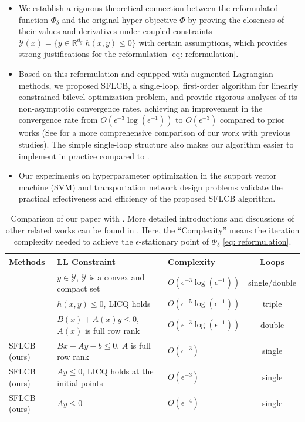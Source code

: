 \documentclass{article}
\newcommand{\Yc}{\mathcal{Y}}
\def\R{\mathbb{R}}
\theoremstyle{plain}
\theoremstyle{definition}
\theoremstyle{remark}
\begin{document}
\begin{itemize}[noitemsep,topsep=0pt,leftmargin = *]
    \item We establish a rigorous theoretical connection between the reformulated function $\Phi_\delta$ and the original hyper-objective $\Phi$ by proving the closeness of their values and derivatives under coupled constraints $\Yc(x)=\{y\in \R^{d_y} | h(x,y)\leq 0\}$ with certain assumptions, which provides strong justifications for the reformulation \eqref{eq: reformulation}.
    \item Based on this reformulation and equipped with augmented Lagrangian methods, 
    we proposed SFLCB, a single-loop, first-order algorithm for linearly constrained bilevel optimization problem,
    and provide rigorous analyses of its non-asymptotic convergence rates, achieving an improvement in the convergence rate from $O(\epsilon^{-3}\log(\epsilon^{-1}))$ to $O(\epsilon^{-3})$ compared to prior works (See  for a more comprehensive comparison of our work with previous studies). The simple single-loop structure also makes our algorithm easier to implement in practice compared to \cite{jiang2024primal}.
    \item Our experiments on hyperparameter optimization in the support vector machine (SVM) and transportation network design problems validate the practical effectiveness and efficiency of the proposed SFLCB algorithm.
\end{itemize}


\begin{table}[h]
    \centering
    \caption{Comparison of our paper with \citep{kwon2023penalty, jiang2024primal}. More detailed introductions and discussions of other related works can be found in . Here, the ``Complexity'' means the iteration complexity needed to achieve the $\epsilon$-stationary point of $\Phi_\delta$ \eqref{eq: reformulation}. }
    \vskip 0.1in
    \begin{tabular}{l l l c }
        \toprule
        \textbf{Methods} & \textbf{LL Constraint} & \textbf{Complexity}  & \textbf{Loops} \\
        \midrule
        \cite{kwon2023penalty} & $y \in \Yc$, $\Yc$ is a convex and compact set & $O(\epsilon^{-3}\log(\epsilon^{-1}))$  & single/double \\
        \cite{jiang2024primal} & $h(x,y) \leq 0$, LICQ holds & $O(\epsilon^{-5} \log(\epsilon^{-1}))$  & triple \\
        \cite{jiang2024primal} & $B(x) + A(x)y \leq 0$, $A(x)$ is full row rank & $O(\epsilon^{-3} \log(\epsilon^{-1}))$  & double \\
        SFLCB (ours) & $Bx + Ay - b \leq 0$, $A$ is full row rank & $O(\epsilon^{-3})$  & single \\
        SFLCB (ours) & $Ay \leq 0$, LICQ holds at the initial points & $O(\epsilon^{-3})$  & single \\
        SFLCB (ours) & $Ay \leq 0$ & $O(\epsilon^{-4})$  & single \\
        \bottomrule
    \end{tabular}
    \label{tab:comparison}
\end{table}
\end{document}
